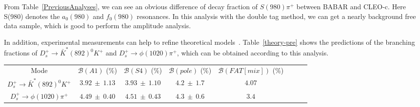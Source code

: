 \documentclass[aps,prd,twocolumn,showpacs,amsmath,amssymb]{revtex4-1}
\begin{document}
    From Table~\ref{PreviousAnalyses}, we can see an obvious difference of decay fraction of $S(980)\pi^{+}$ between BABAR and CLEO-c. 
    Here S(980) denotes the $a_{0}(980)$ and $f_{0}(980)$ resonances.
    In this analysis with the double tag method, we can get a nearly background free data sample, which is good to perform the amplitude analysis.

    In addition, experimental measurements can help to refine theoretical models~\cite{PRD93-114010}.
    Table~\ref{theory-pre} shows the predictions of the branching fractions of $D_{s}^{+} \rightarrow \bar{K}^{*}(892)^{0}K^{+}$ and $D_{s}^{+} \rightarrow \phi(1020)\pi^{+}$, which can be obtained according to this analysis.
    \begin{table*}[htbp]
        \caption{
            $\mathcal{B}(A1)$, $\mathcal{B}(S4)$, $\mathcal{B}(pole)$ and $\mathcal{B}(FAT[mix])$ are 4 theory predictions~\cite{PRD93-114010}. 
        }
        \label{theory-pre}
        \begin{center}
            \begin{tabular}{cccccccc}
                \hline\hline
                Mode &  $\mathcal{B}(A1)$ (\%)& $\mathcal{B}(S4)$ (\%)&  $\mathcal{B}(pole)$ (\%)&$\mathcal{B}(FAT[mix])$ (\%)&\\
                $D_{s}^{+} \rightarrow \bar{K}^{*}(892)^{0}K^{+}$           & $3.92\ \pm\ 1.13$  & $3.93\ \pm\ 1.10$  & $4.2\ \pm\ 1.7$  & $4.07$  \\
                $D_{s}^{+} \rightarrow \phi(1020)\pi^{+}$                   & $4.49\ \pm\ 0.40$  & $4.51\ \pm\ 0.43$  & $4.3\ \pm\ 0.6$  & $3.4$  \\
                \hline
                \hline\hline
            \end{tabular}
        \end{center}
    \end{table*}
\end{document}
